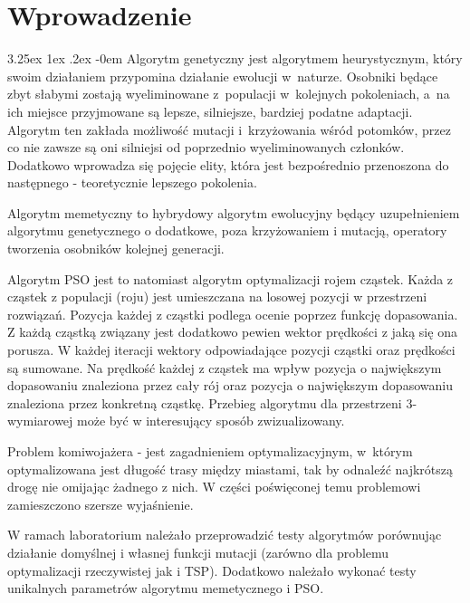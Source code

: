 \documentclass[11pt, a4paper]{article}
\date{\today}
\makeatletter
\newcommand{\fbi}{\leavevmode{\parindent=1em\indent}}
\renewcommand\paragraph{\@startsection{paragraph}{5}{\z@}
  {3.25ex \@plus1ex \@minus.2ex}
  {-0em}
  {\normalfont\normalsize\bfseries}}
\makeatother
\begin{document}


\tableofcontents

\newpage
\section{Wprowadzenie}
\paragraph{}
Algorytm genetyczny jest algorytmem heurystycznym, który swoim działaniem przypomina działanie ewolucji w~naturze. Osobniki będące zbyt słabymi zostają wyeliminowane z~populacji w~kolejnych pokoleniach, a~na ich miejsce przyjmowane są lepsze, silniejsze, bardziej podatne adaptacji. Algorytm ten zakłada możliwość mutacji i~krzyżowania wśród potomków, przez co nie zawsze są oni silniejsi od poprzednio wyeliminowanych członków. Dodatkowo wprowadza się pojęcie elity, która jest bezpośrednio przenoszona do następnego - teoretycznie lepszego pokolenia.

\fbi
Algorytm memetyczny to hybrydowy algorytm ewolucyjny będący uzupełnieniem algorytmu genetycznego o dodatkowe, poza krzyżowaniem i mutacją, operatory tworzenia osobników kolejnej generacji.

\fbi
Algorytm PSO jest to natomiast algorytm optymalizacji rojem cząstek. Każda z cząstek z populacji (roju) jest umieszczana na losowej pozycji w przestrzeni rozwiązań. Pozycja każdej z cząstki podlega ocenie poprzez funkcję dopasowania. Z każdą cząstką związany jest dodatkowo pewien wektor prędkości z jaką się ona porusza. W każdej iteracji wektory odpowiadające pozycji cząstki oraz prędkości są sumowane. Na prędkość każdej z cząstek ma wpływ pozycja o największym dopasowaniu znaleziona przez cały rój oraz pozycja o największym dopasowaniu znaleziona przez konkretną cząstkę. Przebieg algorytmu dla przestrzeni 3-wymiarowej może być w interesujący sposób zwizualizowany.

\fbi
Problem komiwojażera - jest zagadnieniem optymalizacyjnym, w~którym optymalizowana jest długość trasy między miastami, tak by odnaleźć najkrótszą drogę nie omijając żadnego z nich. W części poświęconej temu problemowi zamieszczono szersze wyjaśnienie.

\fbi
W ramach laboratorium należało przeprowadzić testy algorytmów porównując działanie domyślnej i własnej funkcji mutacji (zarówno dla problemu optymalizacji rzeczywistej jak i TSP). Dodatkowo należało wykonać testy unikalnych parametrów algorytmu memetycznego i PSO.
\end{document}
